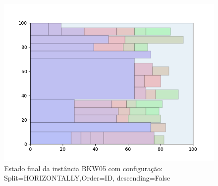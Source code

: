 \begin{figure}[H]
    \centering
    \caption[]{Estado final da instância BKW05 com configuração: Split=HORIZONTALLY,Order=ID, descending=False}
    \label{fig:bkw05-horizontally-id-false}
    \includegraphics[scale=0.5]{output/figures/bkw/bkw05/horizontally/id/false/00}
\end{figure}